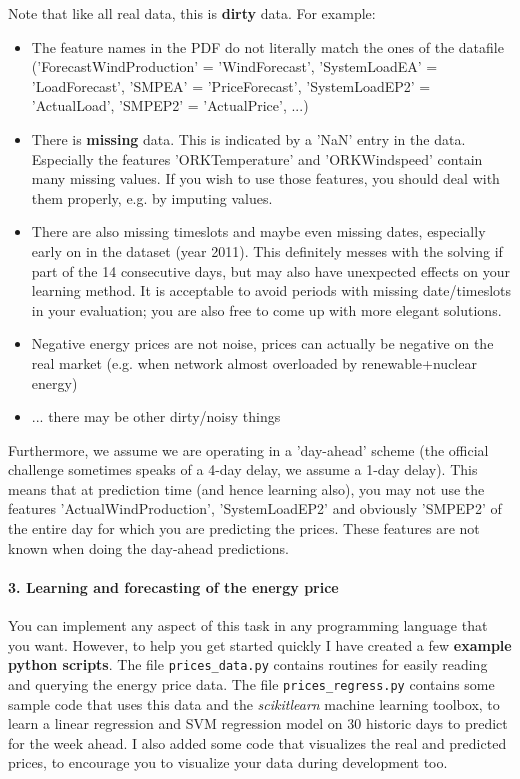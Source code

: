 \documentclass[a4,12pt]{article}
\begin{document}
Note that like all real data, this is \textbf{dirty} data. For example:
\begin{itemize}
\item The feature names in the PDF do not literally match the ones of the datafile ('ForecastWindProduction' = 'WindForecast', 'SystemLoadEA' = 'LoadForecast', 'SMPEA' = 'PriceForecast', 'SystemLoadEP2' = 'ActualLoad', 'SMPEP2' = 'ActualPrice', ...)
\item There is \textbf{missing} data. This is indicated by a 'NaN' entry in the data. Especially the features 'ORKTemperature' and 'ORKWindspeed' contain many missing values. If you wish to use those features, you should deal with them properly, e.g. by imputing values.
\item There are also missing timeslots and maybe even missing dates, especially early on in the dataset (year 2011). This definitely messes with the solving if part of the 14 consecutive days, but may also have unexpected effects on your learning method. It is acceptable to avoid periods with missing date/timeslots in your evaluation; you are also free to come up with more elegant solutions.
\item Negative energy prices are not noise, prices can actually be negative on the real market (e.g. when network almost overloaded by renewable+nuclear energy)
\item ... there may be other dirty/noisy things
\end{itemize}

Furthermore, we assume we are operating in a 'day-ahead' scheme (the official challenge sometimes speaks of a 4-day delay, we assume a 1-day delay). This means that at prediction time (and hence learning also), you may not use the features 'ActualWindProduction', 'SystemLoadEP2' and obviously 'SMPEP2' of the entire day for which you are predicting the prices. These features are not known when doing the day-ahead predictions.


\paragraph{3. Learning and forecasting of the energy price}
You can implement any aspect of this task in any programming language that you want. However, to help you get started quickly I have created a few \textbf{example python scripts}. The file \texttt{prices\_data.py} contains routines for easily reading and querying the energy price data. The file \texttt{prices\_regress.py} contains some sample code that uses this data and the \textit{scikitlearn} machine learning toolbox, to learn a linear regression and SVM regression model on 30 historic days to predict for the week ahead. I also added some code that visualizes the real and predicted prices, to encourage you to visualize your data during development too.
\end{document}
